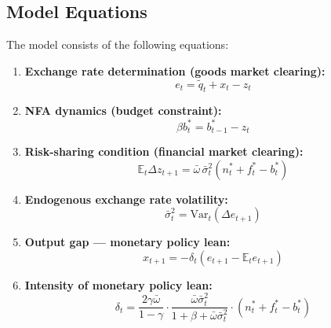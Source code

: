 \documentclass[12pt,a4paper]{article}
\begin{document}
\subsection{Model Equations}

The model consists of the following equations:

\begin{enumerate}

    \item \textbf{Exchange rate determination (goods market clearing):}
    \begin{equation}
        e_t = \tilde{q}_t + x_t - z_t
        \label{eq:er}
    \end{equation}

    \item \textbf{NFA dynamics (budget constraint):}
    \begin{equation}
        \beta b^*_t = b^*_{t-1} - z_t
        \label{eq:nfa}
    \end{equation}

    \item \textbf{Risk-sharing condition (financial market clearing):}
    \begin{equation}
        \mathbb{E}_t \Delta z_{t+1} = \bar{\omega}\,\bar{\sigma}^2_t
        \left(n^*_t + f^*_t - b^*_t\right)
        \label{eq:risksharing}
    \end{equation}

    \item \textbf{Endogenous exchange rate volatility:}
    \begin{equation}
        \bar{\sigma}^2_t = \text{Var}_t\left(\Delta e_{t+1}\right)
        \label{eq:sigma}
    \end{equation}

    \item \textbf{Output gap --- monetary policy lean:}
    \begin{equation}
        x_{t+1} = -\delta_t \left(e_{t+1} - \mathbb{E}_t e_{t+1}\right)
        \label{eq:outputgap}
    \end{equation}

    \item \textbf{Intensity of monetary policy lean:}
    \begin{equation}
        \delta_t = \frac{2\gamma\bar{\omega}}{1-\gamma}
        \cdot \frac{\bar{\omega}\bar{\sigma}^2_t}{1 + \beta + \bar{\omega}\bar{\sigma}^2_t}
        \cdot \left(n^*_t + f^*_t - b^*_t\right)
        \label{eq:delta}
    \end{equation}


\end{enumerate}
\end{document}
